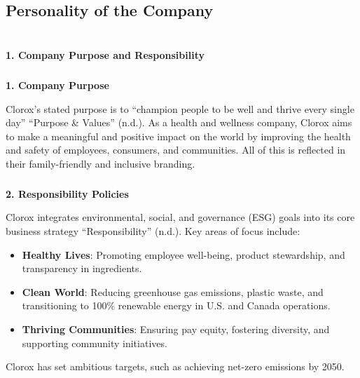 \documentclass[
  letterpaper,
  DIV=11,
  numbers=noendperiod]{scrartcl}
\makeatletter
\let\oldparagraph\paragraph
\renewcommand{\paragraph}{
    \@ifstar
      \xxxParagraphStar
      \xxxParagraphNoStar
  }
\newcommand{\xxxParagraphStar}[1]{\oldparagraph*{#1}\mbox{}}
\newcommand{\xxxParagraphNoStar}[1]{\oldparagraph{#1}\mbox{}}
\let\oldsubparagraph\subparagraph
\renewcommand{\subparagraph}{
    \@ifstar
      \xxxSubParagraphStar
      \xxxSubParagraphNoStar
  }
\newcommand{\xxxSubParagraphStar}[1]{\oldsubparagraph*{#1}\mbox{}}
\newcommand{\xxxSubParagraphNoStar}[1]{\oldsubparagraph{#1}\mbox{}}
\providecommand{\tightlist}{%
  \setlength{\itemsep}{0pt}\setlength{\parskip}{0pt}}\usepackage{longtable,booktabs,array}
\makeatother
\begin{document}
\subsection{Personality of the
Company}\label{personality-of-the-company}

\section{}\label{section-2}

\paragraph{\texorpdfstring{\textbf{1. Company Purpose and
Responsibility}}{1. Company Purpose and Responsibility}}\label{company-purpose-and-responsibility}

\subparagraph{\texorpdfstring{\textbf{1. Company
Purpose}}{1. Company Purpose}}\label{company-purpose}

Clorox's stated purpose is to ``champion people to be well and thrive
every single day'' {``Purpose \& {Values}''} (n.d.). As a health and
wellness company, Clorox aims to make a meaningful and positive impact
on the world by improving the health and safety of employees, consumers,
and communities. All of this is reflected in their family-friendly and
inclusive branding.

\subparagraph{\texorpdfstring{\textbf{2. Responsibility
Policies}}{2. Responsibility Policies}}\label{responsibility-policies}

Clorox integrates environmental, social, and governance (ESG) goals into
its core business strategy {``Responsibility''} (n.d.). Key areas of
focus include:

\begin{itemize}
\tightlist
\item
  \textbf{Healthy Lives}: Promoting employee well-being, product
  stewardship, and transparency in ingredients.\\
\item
  \textbf{Clean World}: Reducing greenhouse gas emissions, plastic
  waste, and transitioning to 100\% renewable energy in U.S. and Canada
  operations.\\
\item
  \textbf{Thriving Communities}: Ensuring pay equity, fostering
  diversity, and supporting community initiatives.
\end{itemize}

Clorox has set ambitious targets, such as achieving net-zero emissions
by 2050.
\end{document}
